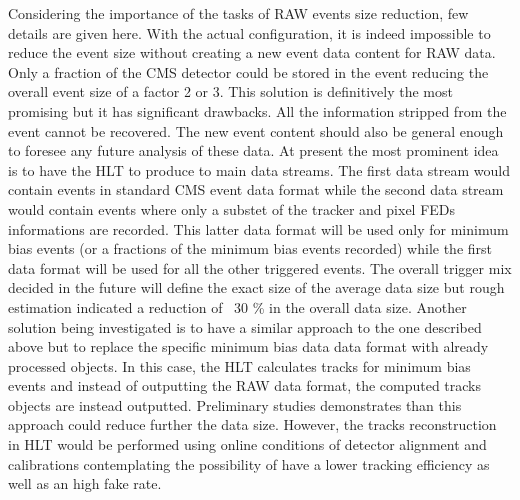 Considering the importance of the tasks of RAW events size reduction, few details are given here. With the actual configuration, it is indeed impossible to reduce the event size without creating a new event data content for RAW data. Only a fraction of the CMS detector could be stored in the event reducing the overall event size of a factor 2 or 3. This solution is definitively the most promising but it has significant drawbacks. All the information stripped from the event cannot be recovered. The new event content should also be general enough to foresee any future analysis of these data. At present the most prominent idea is to have the HLT to produce to main data streams. The first data stream would contain events in standard CMS event data format while the second data stream would contain events where only a substet of the tracker and pixel FEDs informations are recorded. This latter data format will be used only for minimum bias events (or a fractions of the minimum bias events recorded) while the first data format will be used for all the other triggered events. The overall trigger mix decided in the future will define the exact size of the average data size but rough estimation indicated a reduction of ~30 \% in the overall data size. Another solution being investigated is to have a similar approach to the one described above but to replace the specific minimum bias data data format with already processed objects. In this case, the HLT calculates tracks for minimum bias events and instead of outputting the RAW data format, the computed tracks objects are instead outputted. Preliminary studies demonstrates than this approach could reduce further the data size. However, the tracks reconstruction in HLT would be performed using online conditions of detector alignment and calibrations contemplating the possibility of have a lower tracking efficiency as well as an high fake rate. 





